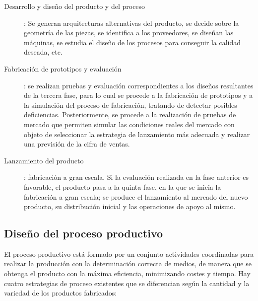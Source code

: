 \documentclass[10pt,a4paper,spanish]{report}
\begin{document}
\begin{description}
                              \item[Desarrollo y diseño del producto y del proceso]: Se generan arquitecturas alternativas del producto, se decide sobre la geometría de las piezas, se identifica a los proveedores, se diseñan las máquinas, se estudia el diseño de los procesos para conseguir la calidad deseada, etc.
                              \item[Fabricación de prototipos y evaluación]: se realizan pruebas y evaluación correspondientes a los diseños resultantes de la tercera fase, para lo cual se procede a la fabricación de prototipos y a la simulación del proceso de fabricación, tratando de detectar posibles deficiencias. Posteriormente, se procede a la realización  de pruebas de mercado que permiten simular las condiciones reales del mercado con objeto de seleccionar la estrategia de lanzamiento más adecuada y realizar una previsión de la cifra de ventas.
                              \item[Lanzamiento del producto]: fabricación a gran escala. Si la evaluación realizada en la fase anterior es favorable, el producto pasa a la quinta fase, en la que se inicia la fabricación a gran escala; se produce el lanzamiento al mercado del nuevo producto, su distribución inicial y las operaciones de apoyo al mismo.
                        \end{description}

            \subsection{\textcolor[rgb]{0.9,0.7,0.6}Diseño del proceso productivo}

                  El proceso productivo está formado por un conjunto actividades coordinadas para realizar la producción con la determinación correcta de medios, de manera que se obtenga el producto con la máxima eficiencia, minimizando costes y tiempo. Hay cuatro estrategias de proceso existentes que se diferencian según la cantidad y la variedad de los productos fabricados:
\end{document}
